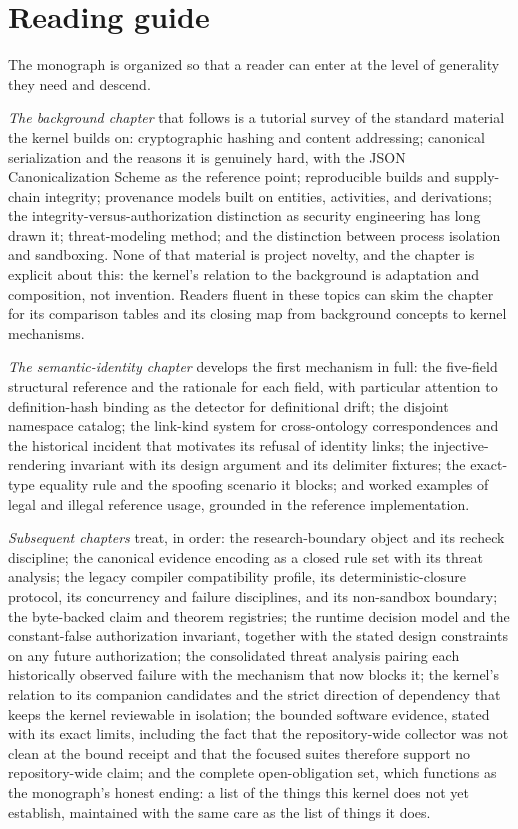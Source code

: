 \section{Reading guide}\label{ch01:guide}

The monograph is organized so that a reader can enter at the level of
generality they need and descend.

\emph{The background chapter} that follows is a tutorial survey of the
standard material the kernel builds on: cryptographic hashing and
content addressing; canonical serialization and the reasons it is
genuinely hard, with the JSON Canonicalization Scheme as the reference
point; reproducible builds and supply-chain integrity; provenance
models built on entities, activities, and derivations; the
integrity-versus-authorization distinction as security engineering has
long drawn it; threat-modeling method; and the distinction between
process isolation and sandboxing. None of that material is project
novelty, and the chapter is explicit about this: the kernel's relation
to the background is adaptation and composition, not invention. Readers
fluent in these topics can skim the chapter for its comparison tables
and its closing map from background concepts to kernel mechanisms.

\emph{The semantic-identity chapter} develops the first mechanism in
full: the five-field structural reference and the rationale for each
field, with particular attention to definition-hash binding as the
detector for definitional drift; the disjoint namespace catalog; the
link-kind system for cross-ontology correspondences and the historical
incident that motivates its refusal of identity links; the
injective-rendering invariant with its design argument and its
delimiter fixtures; the exact-type equality rule and the spoofing
scenario it blocks; and worked examples of legal and illegal reference
usage, grounded in the reference implementation.

\emph{Subsequent chapters} treat, in order: the research-boundary
object and its recheck discipline; the canonical evidence encoding as a
closed rule set with its threat analysis; the legacy compiler
compatibility profile, its deterministic-closure protocol, its
concurrency and failure disciplines, and its non-sandbox boundary; the
byte-backed claim and theorem registries; the runtime decision model
and the constant-false authorization invariant, together with the
stated design constraints on any future authorization; the consolidated
threat analysis pairing each historically observed failure with the
mechanism that now blocks it; the kernel's relation to its companion
candidates and the strict direction of dependency that keeps the kernel
reviewable in isolation; the bounded software evidence, stated with its
exact limits, including the fact that the repository-wide collector was
not clean at the bound receipt and that the focused suites therefore
support no repository-wide claim; and the complete open-obligation
set, which functions as the monograph's honest ending: a list of the
things this kernel does not yet establish, maintained with the same
care as the list of things it does.

